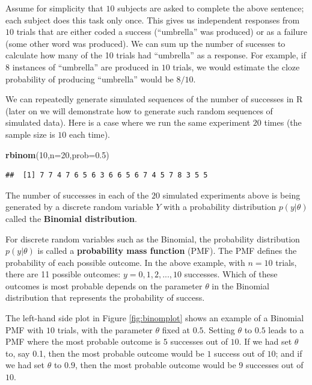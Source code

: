 \documentclass[12pt,]{krantz}
\newenvironment{Shaded}{\begin{snugshade}}{\end{snugshade}}
\newcommand{\DataTypeTok}[1]{\textcolor[rgb]{0.13,0.29,0.53}{#1}}
\newcommand{\DecValTok}[1]{\textcolor[rgb]{0.00,0.00,0.81}{#1}}
\newcommand{\FloatTok}[1]{\textcolor[rgb]{0.00,0.00,0.81}{#1}}
\newcommand{\KeywordTok}[1]{\textcolor[rgb]{0.13,0.29,0.53}{\textbf{#1}}}
\newcommand{\NormalTok}[1]{#1}
\theoremstyle{definition}
\theoremstyle{definition}
\theoremstyle{definition}
\theoremstyle{remark}
\begin{document}
Assume for simplicity that \(10\) subjects are asked to complete the above sentence; each subject does this task only once. This gives us independent responses from \(10\) trials that are either coded a success (``umbrella'' was produced) or as a failure (some other word was produced). We can sum up the number of sucesses to calculate how many of the 10 trials had ``umbrella'' as a response. For example, if \(8\) instances of ``umbrella'' are produced in \(10\) trials, we would estimate the cloze probability of producing ``umbrella'' would be \(8/10\).

We can repeatedly generate simulated sequences of the number of successes in R (later on we will demonstrate how to generate such random sequences of simulated data). Here is a case where we run the same experiment \(20\) times (the sample size is \(10\) each time).

\begin{Shaded}
\begin{Highlighting}[]
\KeywordTok{rbinom}\NormalTok{(}\DecValTok{10}\NormalTok{,}\DataTypeTok{n=}\DecValTok{20}\NormalTok{,}\DataTypeTok{prob=}\FloatTok{0.5}\NormalTok{)}
\end{Highlighting}
\end{Shaded}

\begin{verbatim}
##  [1] 7 7 4 7 6 5 6 3 6 6 5 6 7 4 5 7 8 3 5 5
\end{verbatim}

The number of successes in each of the \(20\) simulated experiments above is being generated by a discrete random variable \(Y\) with a probability distribution \(p(y|\theta)\) called the \textbf{Binomial distribution}.

For discrete random variables such as the Binomial, the probability distribution \(p(y|\theta)\) is called a \textbf{probability mass function} (PMF). The PMF defines the probability of each possible outcome. In the above example, with \(n=10\) trials, there are 11 possible outcomes: \(y=0,1,2,...,10\) successes. Which of these outcomes is most probable depends on the parameter \(\theta\) in the Binomial distribution that represents the probability of success.

The left-hand side plot in Figure \ref{fig:binomplot} shows an example of a Binomial PMF with \(10\) trials, with the parameter \(\theta\) fixed at \(0.5\). Setting \(\theta\) to \(0.5\) leads to a PMF where the most probable outcome is \(5\) successes out of \(10\). If we had set \(\theta\) to, say 0.1, then the most probable outcome would be \(1\) success out of \(10\); and if we had set \(\theta\) to \(0.9\), then the most probable outcome would be \(9\) successes out of \(10\).
\end{document}
